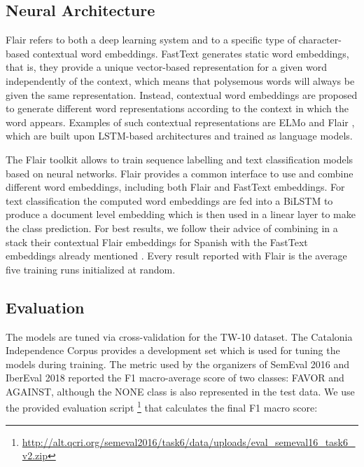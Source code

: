 \documentclass[10pt, a4paper]{article}
\begin{document}
\subsection{Neural Architecture}\label{sec:neural-architecture}

Flair refers to both a deep learning system and to a specific type of character-based contextual word embeddings. FastText generates static word embeddings, that is, they provide a unique vector-based representation for a given word independently of the context, which means that polysemous words will always be given the same representation. Instead, contextual word embeddings are proposed to generate different word representations according to the context in which the word appears. Examples of such contextual representations are ELMo \cite{Peters:2018} and Flair \cite{akbik-etal-2018-contextual}, which are built upon LSTM-based architectures and trained as language models.

The Flair toolkit \cite{akbik-etal-2019-flair} allows to train sequence labelling and text classification models based on neural networks. Flair provides a common interface to use and combine different word embeddings, including both Flair and FastText embeddings. For text classification the computed word embeddings are fed into a BiLSTM to produce a document level embedding which is then used in a linear layer to make the class prediction. For best results, we follow their advice of combining in a stack their contextual Flair embeddings for Spanish with the FastText embeddings already mentioned \cite{akbik-etal-2018-contextual}. Every result reported with Flair is the average five training runs initialized at random.

\subsection{Evaluation}\label{sec:evaluation}

The models are tuned via cross-validation for the TW-10 dataset. The Catalonia Independence Corpus provides a development set which is used for tuning the models during training. The metric used by the organizers of SemEval 2016 \cite{mohammad-etal-2016-semeval} and IberEval 2018 \cite{taule18} reported the F1 macro-average score of two classes: FAVOR and AGAINST, although the NONE class is also represented in the test data. We use the provided evaluation script \footnote{\url{http://alt.qcri.org/semeval2016/task6/data/uploads/eval_semeval16_task6_v2.zip}} that calculates the final F1 macro score:
\end{document}
